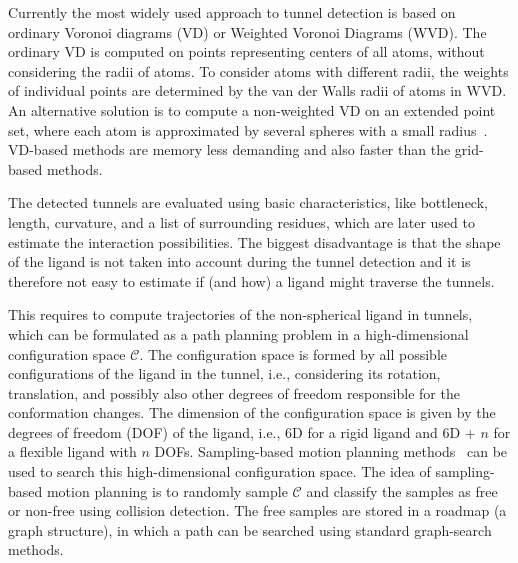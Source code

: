 \documentclass{svmult}
\def\C{\mathcal{C}}
\begin{document}
Currently the most widely used approach to tunnel detection is based on ordinary Voronoi diagrams (VD) or Weighted Voronoi Diagrams (WVD).
The ordinary VD is computed on points representing centers of all atoms, without considering the radii of atoms.
To consider atoms with different radii, the weights of individual points are determined by the van der Walls radii of atoms in WVD.
An alternative solution is to compute a non-weighted VD on an extended point set, where 
each atom is approximated by several spheres with a small radius~\cite{yaffe2008,caver3}.
VD-based methods are memory less demanding and also faster than the grid-based methods.

The detected tunnels are evaluated using basic characteristics, like bottleneck, length, curvature, and a list of surrounding
residues, which are later used to estimate the interaction possibilities.
The biggest disadvantage is that the shape of the ligand is not taken into account during the tunnel detection and it is therefore
not easy to estimate if (and how) a ligand might traverse the tunnels.

This requires to compute trajectories of the non-spherical ligand in tunnels, which can be formulated as a path planning problem in a high-dimensional configuration space $\C$.
The configuration space is formed by all possible configurations of the ligand in the tunnel, i.e., considering its rotation, translation, and possibly also other degrees of freedom responsible for the conformation changes.
The dimension of the configuration space is given by the degrees of freedom (DOF) of the ligand, i.e., 6D for a rigid ligand and 6D + $n$ for a flexible
ligand with $n$ DOFs.
Sampling-based motion planning methods~\cite{Lav06} can be used to search this high-dimensional configuration space.
The idea of sampling-based motion planning is to randomly sample $\C$ and classify the samples as free or non-free using collision detection.
The free samples are stored in a roadmap (a graph structure), in which a path can be searched using standard graph-search methods.
\end{document}
